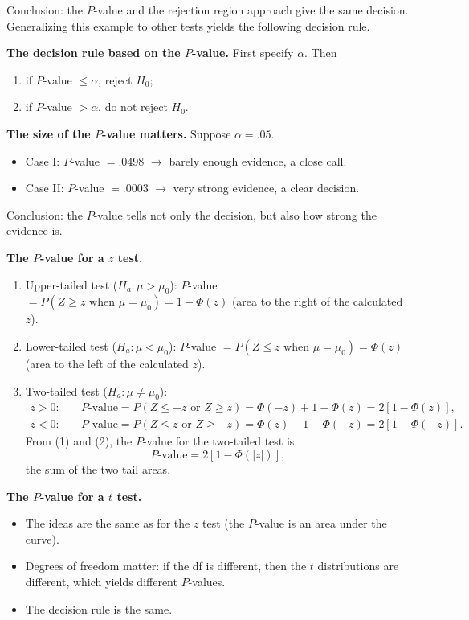 Conclusion: the $P$-value and the rejection region approach give the same decision.
Generalizing this example to other tests yields the following decision rule.

\textbf{The decision rule based on the $P$-value.} First specify $\alpha$. Then
\begin{enumerate}
  \item[(i)] if $P$-value $\le\alpha$, reject $H_0$;
  \item[(ii)] if $P$-value $>\alpha$, do not reject $H_0$.
\end{enumerate}

\textbf{The size of the $P$-value matters.} Suppose $\alpha=.05$.
\begin{itemize}
  \item Case I: $P$-value $=.0498$ $\to$ barely enough evidence, a close call.
  \item Case II: $P$-value $=.0003$ $\to$ very strong evidence, a clear decision.
\end{itemize}
Conclusion: the $P$-value tells not only the decision, but also how strong the evidence is.

\textbf{The $P$-value for a $z$ test.}
\begin{enumerate}
  \item Upper-tailed test ($H_a:\mu>\mu_0$): $P$-value $=P(Z\ge z \text{ when } \mu=\mu_0) = 1-\Phi(z)$ (area to the right of the calculated $z$).
  \item Lower-tailed test ($H_a:\mu<\mu_0$): $P$-value $=P(Z\le z \text{ when } \mu=\mu_0) = \Phi(z)$ (area to the left of the calculated $z$).
  \item Two-tailed test ($H_a:\mu\ne\mu_0$):
  \begin{align*}
  z>0:&\quad P\text{-value} = P(Z\le -z \text{ or } Z\ge z) = \Phi(-z)+1-\Phi(z) = 2[1-\Phi(z)], \tag{1}\\
  z<0:&\quad P\text{-value} = P(Z\le z \text{ or } Z\ge -z) = \Phi(z)+1-\Phi(-z) = 2[1-\Phi(-z)]. \tag{2}
  \end{align*}
  From (1) and (2), the $P$-value for the two-tailed test is
  \[
  P\text{-value} = 2[1-\Phi(|z|)],
  \]
  the sum of the two tail areas.
\end{enumerate}


\textbf{The $P$-value for a $t$ test.}
\begin{itemize}
  \item The ideas are the same as for the $z$ test (the $P$-value is an area under the curve).
  \item Degrees of freedom matter: if the df is different, then the $t$ distributions are different, which yields different $P$-values.
  \item The decision rule is the same.
\end{itemize}

